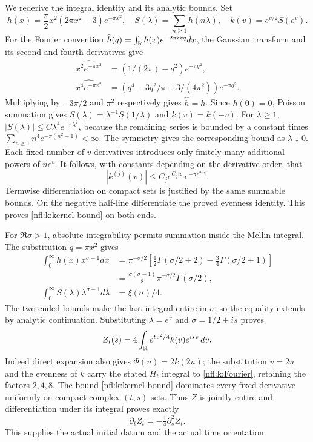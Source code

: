 We rederive the integral identity and its analytic bounds. Set
\[
h(x)=\frac\pi2x^2(2\pi x^2-3)e^{-\pi x^2},\quad
S(\lambda)=\sum_{n\ge1}h(n\lambda),\quad
k(v)=e^{v/2}S(e^v).
\]
For the Fourier convention $\widehat h(q)=\int_\mathbb R h(x)e^{-2\pi ixq}dx$,
the Gaussian transform and its second and fourth derivatives give
\begin{align*}
\widehat{x^2e^{-\pi x^2}}&=(1/(2\pi)-q^2)e^{-\pi q^2},\\
\widehat{x^4e^{-\pi x^2}}&=(q^4-3q^2/\pi+3/(4\pi^2))e^{-\pi q^2}.
\end{align*}
Multiplying by $-3\pi/2$ and $\pi^2$ respectively gives $\widehat h=h$.
Since $h(0)=0$, Poisson summation gives
$S(\lambda)=\lambda^{-1}S(1/\lambda)$ and $k(v)=k(-v)$.
For $\lambda\ge1$,
$|S(\lambda)|\le C\lambda^4e^{-\pi\lambda^2}$, because the
remaining series is bounded by a constant times
$\sum_{n\ge1}n^4e^{-\pi(n^2-1)}<\infty$.
The symmetry gives the corresponding bound as $\lambda\downarrow0$.
Each fixed number of $v$ derivatives introduces only finitely many
additional powers of $ne^v$. It follows, with constants depending
on the derivative order, that
\begin{equation}
|k^{(j)}(v)|\le C_j e^{C_j|v|}e^{-\pi e^{2|v|}}.
\label{nfl:k:kernel-bound}
\end{equation}
Termwise differentiation on compact sets is justified by the same
summable bounds. On the negative half-line differentiate the proved
evenness identity. This proves \eqref{nfl:k:kernel-bound} on both ends.

For $\Re\sigma>1$, absolute integrability permits summation inside
the Mellin integral. The substitution $q=\pi x^2$ gives
\begin{align*}
\int_0^\infty h(x)x^{\sigma-1}dx
 &=\pi^{-\sigma/2}
   \left[\tfrac12\Gamma(\sigma/2+2)-\tfrac34\Gamma(\sigma/2+1)\right]\\
 &=\frac{\sigma(\sigma-1)}8\pi^{-\sigma/2}\Gamma(\sigma/2),\\
\int_0^\infty S(\lambda)\lambda^{\sigma-1}d\lambda&=\xi(\sigma)/4.
\end{align*}
The two-ended bounds make the last integral entire in $\sigma$,
so the equality extends by analytic continuation. Substituting
$\lambda=e^v$ and $\sigma=1/2+is$ proves
\begin{equation}
Z_t(s)=4\int_\mathbb R e^{tv^2/4}k(v)e^{isv}\,dv.
\label{nfl:k:Fourier}
\end{equation}
Indeed direct expansion also gives $\Phi(u)=2k(2u)$; the substitution
$v=2u$ and the evenness of $k$ carry the stated $H_t$ integral
to \eqref{nfl:k:Fourier}, retaining the factors $2,4,8$.
The bound \eqref{nfl:k:kernel-bound} dominates every fixed derivative
uniformly on compact complex $(t,s)$ sets. Thus $Z$ is jointly entire
and differentiation under its integral proves exactly
\begin{equation}
\partial_t Z_t=-\tfrac14\partial_s^2 Z_t.
\label{nfl:k:heat}
\end{equation}
This supplies the actual initial datum and the actual time orientation.

